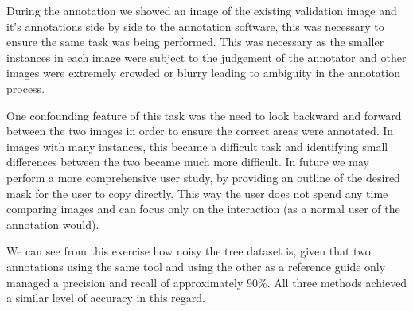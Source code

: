 \documentclass{article}
\begin{document}
During the annotation we showed an image of the existing validation image and it's annotations side by side to the annotation software, this was necessary to ensure the same task was being performed. This was necessary as the smaller instances in each image were subject to the judgement of the annotator and other images were extremely crowded or blurry leading to ambiguity in the annotation process. 

One confounding feature of this task was the need to look backward and forward between the two images in order to ensure the correct areas were annotated. In images with many instances, this became a difficult task and identifying small differences between the two became much more difficult. In future we may perform a more comprehensive user study, by providing an outline of the desired mask for the user to copy directly. This way the user does not spend any time comparing images and can focus only on the interaction (as a normal user of the annotation would).

We can see from this exercise how noisy the tree dataset is, given that two annotations using the same tool and using the other as a reference guide only managed a precision and recall of approximately $ 90\% $. All three methods achieved a similar level of accuracy in this regard. 



\begin{table}[h]
  \centering
    \caption{Statistics from annotating validation set in different ways. Precision, recall and IOU are a comparison with the original validation set. Note figures in brackets are the original statistics of the un-modified predictions from the model}

\noindent{}

\label{tab:annotation_exp}
\end{table}
\end{document}

